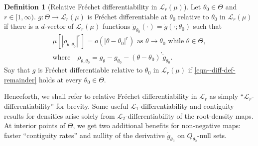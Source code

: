 \documentclass[12pt]{article}
\def\L{\mathscr{L}}
\theoremstyle{definition}
\newtheorem{definition}{Definition}
\theoremstyle{plain}
\begin{document}
\begin{definition}[Relative Fr\'echet differentiability in \(\L_{r}
(\mu)\)]
\label{def--frechet-diff-relative}
Let \(\theta_{0} \in \Theta\) and \(r \in [1, \infty)\).
\(g : \Theta \to \L_{r} (\mu)\) is Fr\'echet differentiable at
\(\theta_{0}\) relative to \(\theta_{0}\) in \(\L_{r} (\mu)\) if there
is a \(d\)-vector of \(\L_{r} (\mu)\) functions \(\dot{g}_{\theta_{0}}
(\cdot) = \dot{g} \left( \cdot; \theta_{0} \right)\) such that
\begin{equation}
  \begin{gathered}
    \mu \left[ \left| \rho_{\theta, \theta_{0}} \right|^{r} \right] = o \left(
    \left| \theta - \theta_{0} \right|^{r} \right) \text{ as } \theta \to
    \theta_{0} \text{ while } \theta \in \Theta, \\
    \text{where} \quad
    \rho_{\theta, \theta_{0}} = g_{\theta} - g_{\theta_{0}} - \left(
    \theta - \theta_{0} \right)^{\prime} \dot{g}_{\theta_{0}}.
  \end{gathered}
  \label{eqn--diff-def-remainder}
\end{equation}
Say that \(g\) is Fr\'echet differentiable relative to \(\theta_{0}\) in
\(\L_{r} (\mu)\) if \eqref{eqn--diff-def-remainder} holds at every
\(\theta_{0} \in \Theta\).
\end{definition}

Henceforth, we shall refer to relative Fr\'echet differentiability in
\(\L_{r}\) as simply ``\(\L_{r}\)-differentiability'' for
brevity.
Some useful \(\L_{1}\)-differentiability and contiguity results for
densities arise solely from \(\L_{2}\)-differentiability of the
root-density maps.
At interior points of \(\Theta\), we get two additional benefits for
non-negative maps:
faster ``contiguity rates'' and nullity of the derivative
\(\dot{g}_{\theta_{0}}\) on \(Q_{\theta_{0}}\)-null sets.
\end{document}
